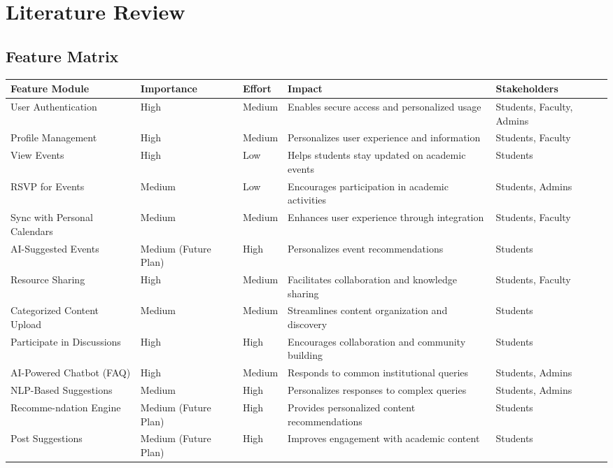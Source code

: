 \chapter{Literature Review}

\section{Feature Matrix}

\begin{longtable}{|L{2cm}|C{2.2cm}|C{2cm}|L{4cm}|L{2.5cm}|}
\hline
\textbf{Feature Module} & \textbf{Importance} & \textbf{Effort} & \textbf{Impact} & \textbf{Stakeholders} \\
\hline
User Authentication & High & Medium & Enables secure access and personalized usage & Students, Faculty, Admins \\
\hline
Profile Management & High & Medium & Personalizes user experience and information & Students, Faculty \\
\hline
View Events & High & Low & Helps students stay updated on academic events & Students \\
\hline
RSVP for Events & Medium & Low & Encourages participation in academic activities & Students, Admins \\
\hline
Sync with Personal Calendars & Medium & Medium & Enhances user experience through integration & Students, Faculty \\
\hline
AI-Suggested Events & Medium (Future Plan) & High & Personalizes event recommendations & Students \\
\hline
Resource Sharing & High & Medium & Facilitates collaboration and knowledge sharing & Students, Faculty \\
\hline
Categorized Content Upload & Medium & Medium & Streamlines content organization and discovery & Students \\
\hline
Participate in Discussions & High & High & Encourages collaboration and community building & Students \\
\hline
AI-Powered Chatbot (FAQ) & High & Medium & Responds to common institutional queries & Students, Admins \\
\hline
NLP-Based Suggestions & Medium & High & Personalizes responses to complex queries & Students, Admins \\
\hline
Recomme-ndation Engine & Medium (Future Plan) & High & Provides personalized content recommendations & Students \\
\hline
Post Suggestions & Medium (Future Plan) & High & Improves engagement with academic content & Students \\

\end{longtable}
